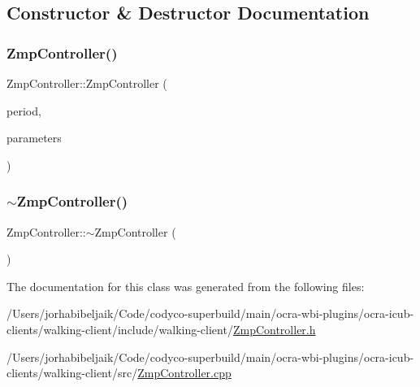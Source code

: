 \subsection{Constructor \& Destructor Documentation}
\hypertarget{classZmpController_a99bbb6b02a6abafa3968d5c7a77e462b}{}\label{classZmpController_a99bbb6b02a6abafa3968d5c7a77e462b} 
\subsubsection{\texorpdfstring{Zmp\+Controller()}{ZmpController()}}
{\footnotesize\ttfamily Zmp\+Controller\+::\+Zmp\+Controller (\begin{DoxyParamCaption}\item[{const int}]{period,  }\item[{struct \hyperlink{structZmpPreviewParams}{Zmp\+Preview\+Params}}]{parameters }\end{DoxyParamCaption})}

\hypertarget{classZmpController_af308a70e70cfe9a1e9569606da8b1739}{}\label{classZmpController_af308a70e70cfe9a1e9569606da8b1739} 
\subsubsection{\texorpdfstring{$\sim$\+Zmp\+Controller()}{~ZmpController()}}
{\footnotesize\ttfamily Zmp\+Controller\+::$\sim$\+Zmp\+Controller (\begin{DoxyParamCaption}{ }\end{DoxyParamCaption})\hspace{0.3cm}{\ttfamily [virtual]}}



The documentation for this class was generated from the following files\+:\begin{DoxyCompactItemize}
\item 
/\+Users/jorhabibeljaik/\+Code/codyco-\/superbuild/main/ocra-\/wbi-\/plugins/ocra-\/icub-\/clients/walking-\/client/include/walking-\/client/\hyperlink{ZmpController_8h}{Zmp\+Controller.\+h}\item 
/\+Users/jorhabibeljaik/\+Code/codyco-\/superbuild/main/ocra-\/wbi-\/plugins/ocra-\/icub-\/clients/walking-\/client/src/\hyperlink{ZmpController_8cpp}{Zmp\+Controller.\+cpp}\end{DoxyCompactItemize}
